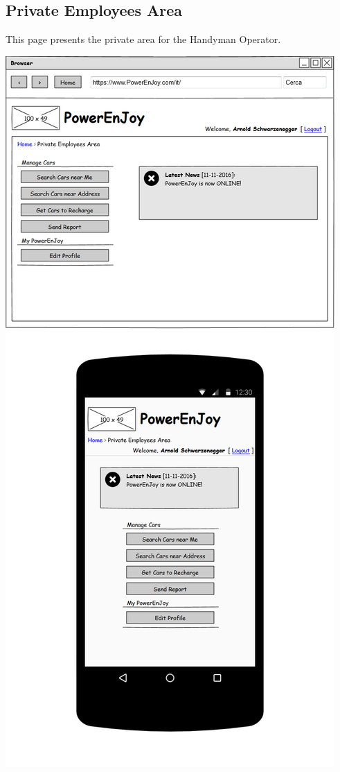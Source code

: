 \subsection{Private Employees Area} This page presents the private area for the Handyman Operator.
\begin{center}
	\includegraphics[width=0.6\linewidth]{"img/ui/private-area-employee"}
\end{center}
\pagebreak


